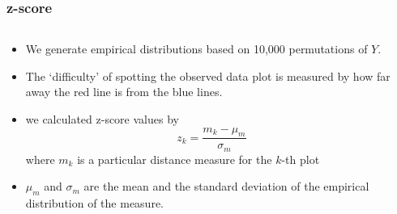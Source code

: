 \documentclass{beamer}
\begin{document}
\begin{frame}
\frametitle{z-score}
	\begin{columns}

	\begin{column}{0.55\textwidth}
		\begin{itemize}
		\item We generate empirical distributions based on 10,000 permutations of $Y$.
		\item The `difficulty' of spotting the observed data plot is measured by how far away the red 		line is from the blue lines.
		\item we calculated z-score values by
		$$z_k = \frac{m_k - \mu_m}{\sigma_m}$$
		where $m_k$ is a particular distance measure for the $k$-th plot
		\item  $\mu_m$ and $\sigma_m$ are the mean and the standard deviation of the empirical 		distribution of the measure.
		\end{itemize}
	\end{column}

	\begin{column}{0.45\textwidth}
		 \begin{center}
		 \end{center}
	\end{column}
\end{columns}
\end{frame}
\end{document}
